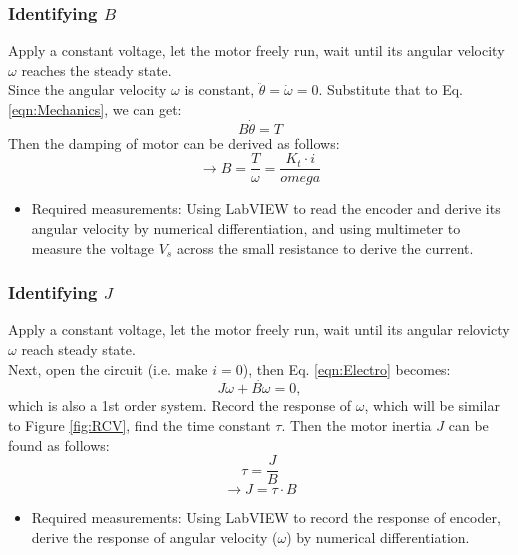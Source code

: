 \documentclass{article}
\begin{document}
\subsubsection{Identifying $B$}
Apply a constant voltage, let the motor freely run, wait until its angular velocity $\omega$ reaches the steady state.\\
Since the angular velocity $\omega$ is constant, $\ddot{\theta}=\dot{\omega}=0$. Substitute that to Eq. \eqref{eqn:Mechanics}, we can get:
\[B\dot{\theta}=T\]
Then the damping of motor can be derived as follows:
\[\rightarrow B=\frac{T}{\omega}=\frac{K_t\cdot i}{omega}\]
\begin{itemize}
\item Required measurements: Using LabVIEW to read the encoder and derive its angular velocity by numerical differentiation, and using multimeter to measure the voltage $V_s$ across the small resistance to derive the current.
\end{itemize}


\subsubsection{Identifying $J$}
Apply a constant voltage, let the motor freely run, wait until its angular relovicty $\omega$ reach steady state.\\
Next, open the circuit (i.e. make $i=0$), then Eq. \eqref{eqn:Electro} becomes:
\[J\dot{\omega+B\omega=0},\]
which is also a 1st order system.
Record the response of $\omega$, which will be similar to Figure \ref{fig:RCV}, find the time constant $\tau$. Then the motor inertia $J$ can be found as follows:
\[\tau=\frac{J}{B}\]
\[\rightarrow J=\tau \cdot B\]
\begin{itemize}
\item Required measurements: Using LabVIEW to record the response of encoder, derive the response of angular velocity ($\omega$) by numerical differentiation.
\end{itemize}









\end{document}
